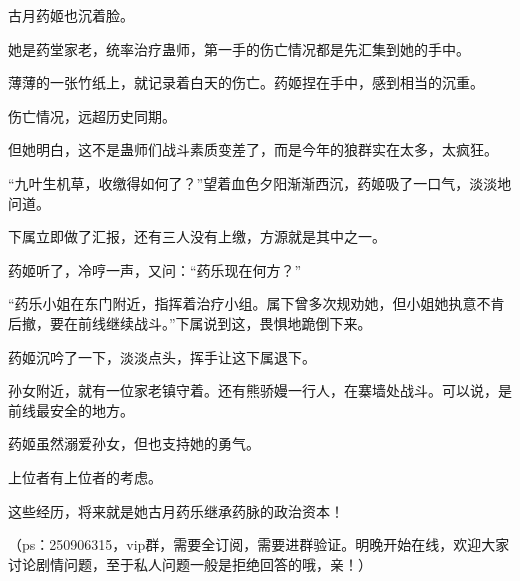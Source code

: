 \begin{this_body}
古月药姬也沉着脸。

她是药堂家老，统率治疗蛊师，第一手的伤亡情况都是先汇集到她的手中。

薄薄的一张竹纸上，就记录着白天的伤亡。药姬捏在手中，感到相当的沉重。

伤亡情况，远超历史同期。

但她明白，这不是蛊师们战斗素质变差了，而是今年的狼群实在太多，太疯狂。

“九叶生机草，收缴得如何了？”望着血色夕阳渐渐西沉，药姬吸了一口气，淡淡地问道。

下属立即做了汇报，还有三人没有上缴，方源就是其中之一。

药姬听了，冷哼一声，又问：“药乐现在何方？”

“药乐小姐在东门附近，指挥着治疗小组。属下曾多次规劝她，但小姐她执意不肯后撤，要在前线继续战斗。”下属说到这，畏惧地跪倒下来。

药姬沉吟了一下，淡淡点头，挥手让这下属退下。

孙女附近，就有一位家老镇守着。还有熊骄嫚一行人，在寨墙处战斗。可以说，是前线最安全的地方。

药姬虽然溺爱孙女，但也支持她的勇气。

上位者有上位者的考虑。

这些经历，将来就是她古月药乐继承药脉的政治资本！

（ps：250906315，vip群，需要全订阅，需要进群验证。明晚开始在线，欢迎大家讨论剧情问题，至于私人问题一般是拒绝回答的哦，亲！）

\end{this_body}

